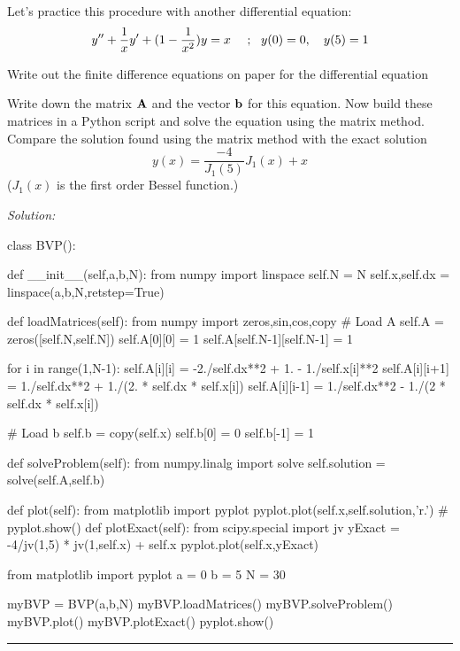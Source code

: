 \begin{enumerate}
\probtwo \label{P:10.2}Let's practice this procedure with another differential
equation:
\begin{equation}
        y'' + {1 \over x} y' +(1-{1 \over x^2}) y = x~~~~;~~y(0)=0,~~~y(5)=1
\end{equation}

\begin{enumerate}
\subprob {} Write out the finite difference
    equations on paper for the differential equation
    
\subprob Write down the matrix $\bf A$ and the vector $\bf b$
    for this equation. 
\subprob Now build these matrices in a
    Python script and solve the equation using the matrix
    method. Compare the solution found using the matrix
    method with the exact solution
    \[
        y(x) = \frac{-4}{J_1(5)} J_1(x) + x
    \]
    ($J_1(x)$ is the first order Bessel function.)

\end{enumerate}
\end{enumerate}
\ifsolutions
\textit{Solution:}\\
\begin{codeexample}
\begin{VerbatimOut}{\listingFile}
class BVP():

    def __init__(self,a,b,N):
        from numpy import linspace
        self.N = N
        self.x,self.dx = linspace(a,b,N,retstep=True)


    def loadMatrices(self):
        from numpy import zeros,sin,cos,copy
        # Load A
        self.A = zeros([self.N,self.N])
        self.A[0][0] = 1
        self.A[self.N-1][self.N-1] = 1

        for i in range(1,N-1):
            self.A[i][i] = -2./self.dx**2 + 1. -  1./self.x[i]**2
            self.A[i][i+1] = 1./self.dx**2 + 1./(2. * self.dx * self.x[i])
            self.A[i][i-1] = 1./self.dx**2 - 1./(2 * self.dx * self.x[i])

        # Load b
        self.b = copy(self.x)
        self.b[0] = 0
        self.b[-1] = 1

    def solveProblem(self):
        from numpy.linalg import solve
        self.solution = solve(self.A,self.b)

    def plot(self):
        from matplotlib import pyplot
        pyplot.plot(self.x,self.solution,'r.')
        #        pyplot.show()
    def plotExact(self):
        from scipy.special import jv
        yExact = -4/jv(1,5) * jv(1,self.x) + self.x
        pyplot.plot(self.x,yExact)

from matplotlib import pyplot
a = 0
b = 5
N = 30

myBVP = BVP(a,b,N)
myBVP.loadMatrices()
myBVP.solveProblem()
myBVP.plot()
myBVP.plotExact()
pyplot.show()
\end{VerbatimOut}
\end{codeexample}
\else
\noindent\rule{5 in}{0.01 in}
\fi

